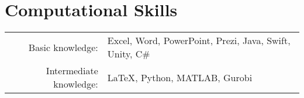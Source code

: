 \documentclass[a4paper,10pt]{article}
\begin{document}
\section{Computational Skills}
\begin{tabular}{rl}
Basic knowledge:
	& Excel, Word, PowerPoint, Prezi, Java, Swift, Unity, C\# 	\\

Intermediate knowledge:
	& {\fb \LaTeX}, Python, MATLAB, Gurobi	\\
\end{tabular}


%		
%		
%		
%		
%		
\end{document}

